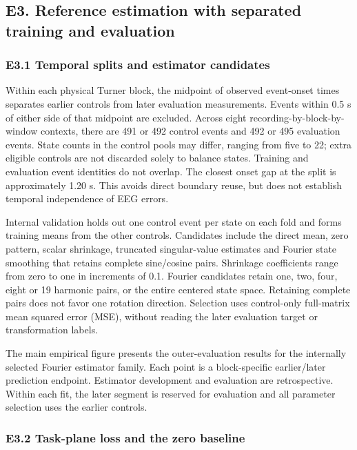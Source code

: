 \documentclass[11pt,a4paper]{article}
\begin{document}
\subsection{E3. Reference estimation with separated training and
evaluation}\label{e3.-reference-estimation-with-separated-training-and-evaluation}

\subsubsection{E3.1 Temporal splits and estimator
candidates}\label{e3.1-temporal-splits-and-estimator-candidates}

Within each physical Turner block, the midpoint of observed event-onset
times separates earlier controls from later evaluation measurements.
Events within 0.5 s of either side of that midpoint are excluded. Across
eight recording-by-block-by-window contexts, there are 491 or 492
control events and 492 or 495 evaluation events. State counts in the
control pools may differ, ranging from five to 22; extra eligible
controls are not discarded solely to balance states. Training and
evaluation event identities do not overlap. The closest onset gap at the
split is approximately 1.20 s. This avoids direct boundary reuse, but
does not establish temporal independence of EEG errors.

Internal validation holds out one control event per state on each fold
and forms training means from the other controls. Candidates include the
direct mean, zero pattern, scalar shrinkage, truncated singular-value
estimates and Fourier state smoothing that retains complete sine/cosine
pairs. Shrinkage coefficients range from zero to one in increments of
0.1. Fourier candidates retain one, two, four, eight or 19 harmonic
pairs, or the entire centered state space. Retaining complete pairs does
not favor one rotation direction. Selection uses control-only
full-matrix mean squared error (MSE), without reading the later
evaluation target or transformation labels.

The main empirical figure presents the outer-evaluation results for the
internally selected Fourier estimator family. Each point is a
block-specific earlier/later prediction endpoint. Estimator development
and evaluation are retrospective. Within each fit, the later segment is
reserved for evaluation and all parameter selection uses the earlier
controls.

\subsubsection{E3.2 Task-plane loss and the zero
baseline}\label{e3.2-task-plane-loss-and-the-zero-baseline}
\end{document}
